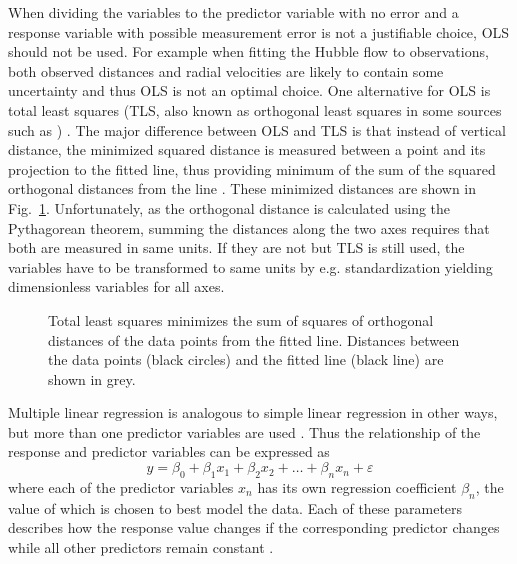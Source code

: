 \documentclass[english, twoside]{HYgradu}
\begin{document}
When dividing the variables to the predictor variable with no error and a response variable with possible measurement error is not a justifiable choice, OLS should not be used. For example when fitting the Hubble flow to observations, both observed distances and radial velocities are likely to contain some uncertainty and thus OLS is not an optimal choice. One alternative for OLS is total least squares (TLS, also known as orthogonal least squares in some sources such as \citet{feigelson2012modern}) \citep{markovsky2007overview}.  The major difference between OLS and TLS is that instead of vertical distance, the minimized squared distance is measured between a point and its projection to the fitted line, thus providing minimum of the sum of the squared orthogonal distances from the line \citep{feigelson2012modern}. These minimized distances are shown in Fig.\ \ref{fig:TLS}. Unfortunately, as the orthogonal distance is calculated using the Pythagorean theorem, summing the distances along the two axes requires that both are measured in same units. If they are not but TLS is still used, the variables have to be transformed to same units by e.g. standardization yielding dimensionless variables for all axes.

\begin{figure}
    \centering
    
    \caption{Total least squares minimizes the sum of squares of orthogonal distances of the data points from the fitted line. Distances between the data points (black circles) and the fitted line (black line) are shown in grey.}\label{fig:TLS}
\end{figure}

Multiple linear regression is analogous to simple linear regression in other ways, but more than one predictor variables are used \citep{xin2009linear}. Thus the relationship of the response and predictor variables can be expressed as
\begin{equation}
	y = \beta_0 + \beta_1 x_1 + \beta_2 x_2 + \dots + \beta_n x_n + \varepsilon
\end{equation}
where each of the predictor variables $x_n$ has its own regression coefficient $\beta_n$, the value of which is chosen to best model the data. Each of these parameters describes how the response value changes if the corresponding predictor changes while all other predictors remain constant \citep{montgomery2012introduction}.
\end{document}
